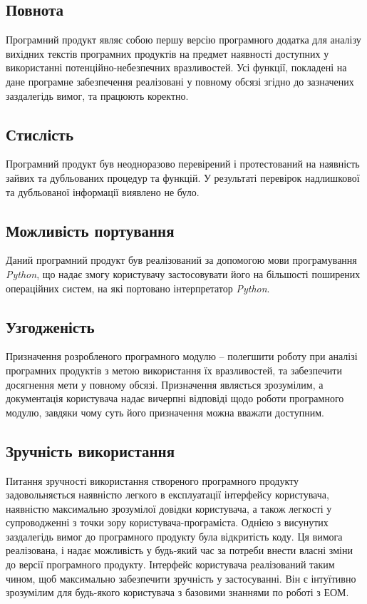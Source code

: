 \subsection{Повнота}\label{mark_fully}
Програмний продукт являє собою першу версію програмного додатка для аналізу вихідних текстів програмних продуктів на предмет наявності доступних у використанні потенційно-небезпечних вразливостей. Усі функції, покладені на дане програмне забезпечення реалізовані у повному обсязі згідно до зазначених заздалегідь вимог, та працюють коректно.

\subsection{Стислість}\label{mark_compact}
Програмний продукт був неодноразово перевірений і протестований на наявність зайвих та дубльованих процедур та функцій. У результаті перевірок надлишкової та дубльованої інформації виявлено не було.

\subsection{Можливість портування}\label{mark_portability}
Даний програмний продукт був реалізований за допомогою мови програмування {\it Python}, що надає змогу користувачу  застосовувати його на більшості поширених операційних систем, на які портовано інтерпретатор {\it Python}.

\subsection{Узгодженість}\label{mark_correct}
Призначення розробленого програмного модулю – полегшити роботу при аналізі програмних продуктів з метою використання їх вразливостей, та забезпечити досягнення мети у повному обсязі. Призначення являється зрозумілим, а документація користувача надає вичерпні відповіді щодо роботи програмного модулю, завдяки чому суть його призначення можна вважати доступним.

\subsection{Зручність використання}\label{mark_usability}
Питання зручності використання створеного програмного продукту задовольняється наявністю легкого в експлуатації інтерфейсу користувача, наявністю максимально зрозумілої довідки користувача, а також легкості у супроводженні з точки зору користувача-програміста.
Однією з висунутих заздалегідь вимог до програмного продукту була відкритість коду. Ця вимога реалізована, і надає можливість у будь-який час за потреби внести власні зміни до версії програмного продукту.
Інтерфейс користувача реалізований таким чином, щоб максимально забезпечити зручність у застосуванні. Він є інтуїтивно зрозумілим для будь-якого користувача з базовими знаннями по роботі з ЕОМ.

